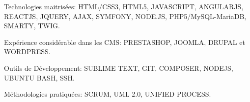 \begin{cventries}
  \cventry
    {}
    {}
    {}
    {}
    {
      \begin{cvitems}
        \item {Technologies maitrisées: HTML/CSS3, HTML5, JAVASCRIPT, ANGULARJS, REACTJS, JQUERY, AJAX, SYMFONY, NODE.JS, PHP5/MySQL-MariaDB, SMARTY, TWIG.}
        \item {Expérience considérable dans les CMS: PRESTASHOP, JOOMLA, DRUPAL et WORDPRESS.}
        \item {Outils de Développement: SUBLIME TEXT, GIT, COMPOSER, NODEJS, UBUNTU BASH, SSH.}
        \item {Méthodologie​s pratiquées: SCRUM, UML 2.0, UNIFIED PROCESS.}
      \end{cvitems}
    }
\end{cventries}